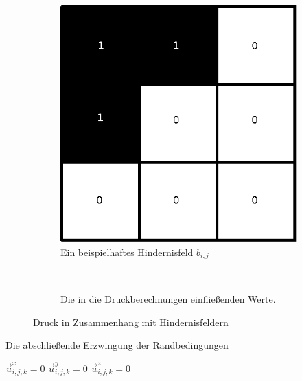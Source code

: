 \begin{figure}[ht]
	\begin{subfigure}[t]{0.5\textwidth}
		\centering
		\includegraphics[width=\textwidth]{images/boundary_field_for_pressure}
		\caption{Ein beispielhaftes Hindernisfeld $b_{i,j}$}
	\end{subfigure}
    ~
	\begin{subfigure}[t]{0.5\textwidth}
		\centering
		\def\svgwidth{\textwidth}
		
		\caption{Die in die Druckberechnungen einfließenden Werte.}
\label{fig:stam_modified_jacobi_algorithm}
	\end{subfigure}
    \caption{Druck in Zusammenhang mit Hindernisfeldern}
\end{figure}

\begin{algorithm}
\caption{Die abschließende Erzwingung der Randbedingungen}
\begin{algorithmic}
			\State $\vec{u}_{i,j,k}^x = 0$
		\EndIf
			\State $\vec{u}_{i,j,k}^y = 0$
		\EndIf
			\State $\vec{u}_{i,j,k}^z = 0$
		\EndIf
	\EndFor
\EndFunction
\end{algorithmic}
\label{alg:stam_enforce_free_slip}
\end{algorithm}
